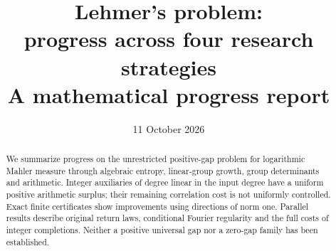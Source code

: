 \documentclass[11pt,a4paper]{article}
\title{Lehmer's problem:\protect\\ progress across four research strategies\protect\\[6pt]\large A mathematical progress report}
\author{}
\date{11 October 2026}
\theoremstyle{definition}
\theoremstyle{remark}
\numberwithin{equation}{section}
\begin{document}
\maketitle
\begin{abstract}
We summarize progress on the unrestricted positive-gap problem for logarithmic Mahler measure through algebraic entropy, linear-group growth, group determinants and arithmetic.
Integer auxiliaries of degree linear in the input degree have a uniform positive arithmetic surplus; their remaining correlation cost is not uniformly controlled.
Exact finite certificates show improvements using directions of norm one.
Parallel results describe original return laws, conditional Fourier regularity and the full costs of integer completions.
Neither a positive universal gap nor a zero-gap family has been established.
\end{abstract}
\newpage
\tableofcontents
\newpage

\clearpage





\begingroup
\small
\raggedright

\endgroup
\end{document}
